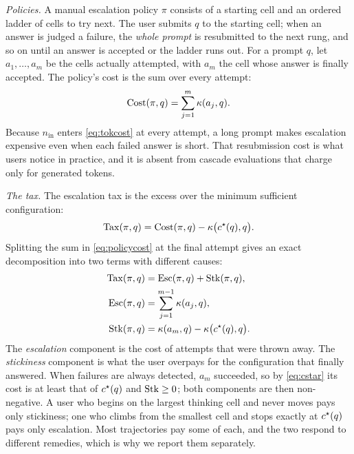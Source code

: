 \emph{Policies.} A manual escalation policy $\pi$ consists of a starting
cell and an ordered ladder of cells to try next. The user submits $q$ to the
starting cell; when an answer is judged a failure, the \emph{whole prompt}
is resubmitted to the next rung, and so on until an answer is accepted or
the ladder runs out. For a prompt $q$, let $a_1, \dots, a_m$ be the cells
actually attempted, with $a_m$ the cell whose answer is finally accepted.
The policy's cost is the sum over every attempt:
\begin{equation}
  \mathrm{Cost}(\pi, q) = \sum_{j=1}^{m} \kappa(a_j, q).
  \label{eq:policycost}
\end{equation}
Because $n_{\mathrm{in}}$ enters \eqref{eq:tokcost} at every attempt, a
long prompt makes escalation expensive even when each failed answer is
short. That resubmission cost is what users notice in practice, and it is
absent from cascade evaluations that charge only for generated tokens.

\emph{The tax.} The escalation tax is the excess over the minimum
sufficient configuration:
\begin{equation}
  \mathrm{Tax}(\pi, q) = \mathrm{Cost}(\pi, q) - \kappa\bigl(c^{\star}(q), q\bigr).
  \label{eq:tax}
\end{equation}
Splitting the sum in \eqref{eq:policycost} at the final attempt gives an
exact decomposition into two terms with different causes:
\begin{align}
  \mathrm{Tax}(\pi, q) &= \mathrm{Esc}(\pi, q) + \mathrm{Stk}(\pi, q), \label{eq:decomp}\\
  \mathrm{Esc}(\pi, q) &= \sum_{j=1}^{m-1} \kappa(a_j, q), \nonumber\\
  \mathrm{Stk}(\pi, q) &= \kappa(a_m, q) - \kappa\bigl(c^{\star}(q), q\bigr). \nonumber
\end{align}
The \emph{escalation} component is the cost of attempts that were thrown
away. The \emph{stickiness} component is what the user overpays for the
configuration that finally answered. When failures are always detected,
$a_m$ succeeded, so by \eqref{eq:cstar} its cost is at least that of
$c^{\star}(q)$ and $\mathrm{Stk} \geq 0$; both components are then non-negative. A
user who begins on the largest thinking cell and never moves pays only
stickiness; one who climbs from the smallest cell and stops exactly at
$c^{\star}(q)$ pays only escalation. Most trajectories pay some of each, and
the two respond to different remedies, which is why we report them
separately.

